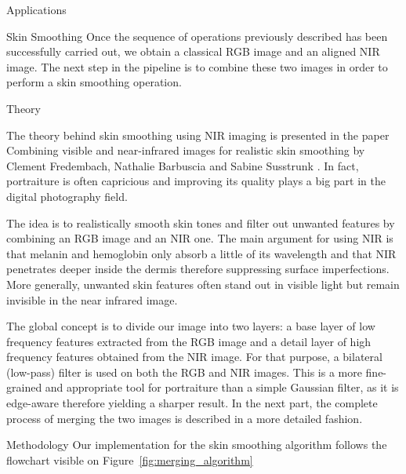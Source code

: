 \documentclass[10pt]{article}
\begin{document}
\begin{section}{Applications}

    \begin{subsection}{Skin Smoothing}
        \label{sec:skin_smoothing}
        Once the sequence of operations previously described has been successfully carried out, we obtain a classical RGB image and an aligned NIR image. The next step in the pipeline is to combine these two images in order to perform a skin smoothing operation.

        \begin{subsubsection}{Theory}

            The theory behind skin smoothing using NIR imaging is presented in the paper Combining visible and near-infrared images for realistic skin smoothing by Clement Fredembach, Nathalie Barbuscia and Sabine Susstrunk \cite{skin}. In fact, portraiture is often capricious and improving its quality plays a big part in the digital photography field.

            \medskip

            The idea is to realistically smooth skin tones and filter out unwanted features by combining an RGB image and an NIR one. The main argument for using NIR is that melanin and hemoglobin only absorb a little of its wavelength and that NIR penetrates deeper inside the dermis therefore suppressing surface imperfections. More generally, unwanted skin features often stand out in visible light but remain invisible in the near infrared image.

            \medskip

            The global concept is to divide our image into two layers: a base layer of low frequency features extracted from the RGB image and a detail layer of high frequency features obtained from the NIR image. For that purpose, a bilateral (low-pass) filter is used on both the RGB and NIR images. This is a more fine-grained and appropriate tool for portraiture than a simple Gaussian filter, as it is edge-aware therefore yielding a sharper result. In the next part, the complete process of merging the two images is described in a more detailed fashion.

        \end{subsubsection}

        \begin{subsubsection}{Methodology}
            Our implementation for the skin smoothing algorithm follows the flowchart visible on Figure~\ref{fig:merging_algorithm}


\end{subsubsection}
\end{subsection}
\end{section}
\end{document}
